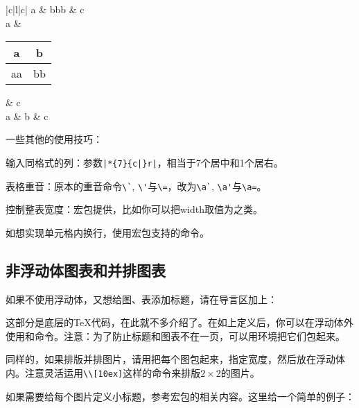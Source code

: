 \begin{codeshow}
\begin{tabular}{|c|l|c|}
\hline
a & bbb & c \\ \hline
a & 
{\begin{tabular}{c|c}
a & b \\ \hline
aa & bb \\
\end{tabular}}
& c \\ \hline
a & b & c \\ \hline
\end{tabular}
\end{codeshow}

一些其他的使用技巧：
\begin{feae}
\item 输入同格式的列：参数\verb+|*{7}{c|}r|+，相当于7个居中和1个居右。
\item 表格重音：原本的重音命令\verb|\`|, \verb|\'|与\verb|\=|，改为\verb|\a`|, \verb|\a'|与\verb|\a=|。
\item 控制整表宽度：宏包提供，比如你可以把width取值为之类。
\item 如想实现单元格内换行，使用宏包支持的命令。
\end{feae}

\subsection{非浮动体图表和并排图表}
如果不使用浮动体，又想给图、表添加标题，请在导言区加上：
\begin{latex}
\makeatletter
\newcommand\figcaption{\def\@captype{figure}\caption}
\newcommand\tabcaption{\def\@captype{table}\caption}
\makeatother
\end{latex}

这部分是底层的\TeX 代码，在此就不多介绍了。在如上定义后，你可以在浮动体外使用和命令。注意：为了防止标题和图表不在一页，可以用环境把它们包起来。

同样的，如果排版并排图片，请用把每个图包起来，指定宽度，然后放在浮动体内。注意灵活运用\verb|\\[10ex]|这样的命令来排版$2\times 2$的图片。

如果需要给每个图片定义小标题，参考宏包的相关内容。这里给一个简单的例子：
\begin{latex}
\begin{figure}
\centering
\subfloat[...]{\label{sub-fig-1}
    \begin{minipage}
    \centering
    \texttt{[image: ...]}
    \end{minipage}}
\quad\subfloat[...]
\end{latex}

